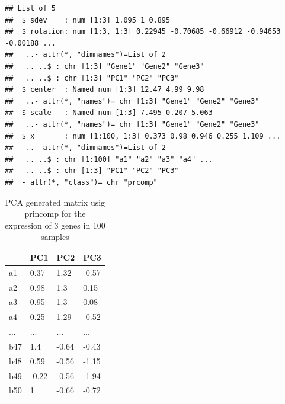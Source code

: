 \documentclass[]{article}
\newenvironment{Shaded}{\begin{snugshade}}{\end{snugshade}}
\newcommand{\KeywordTok}[1]{\textcolor[rgb]{0.13,0.29,0.53}{\textbf{{#1}}}}
\newcommand{\DataTypeTok}[1]{\textcolor[rgb]{0.13,0.29,0.53}{{#1}}}
\newcommand{\StringTok}[1]{\textcolor[rgb]{0.31,0.60,0.02}{{#1}}}
\newcommand{\CommentTok}[1]{\textcolor[rgb]{0.56,0.35,0.01}{\textit{{#1}}}}
\newcommand{\NormalTok}[1]{{#1}}
\numberwithin{figure}{section}
\numberwithin{table}{section}
\theoremstyle{definition}
\theoremstyle{definition}
\theoremstyle{definition}
\theoremstyle{remark}
\begin{document}
\begin{verbatim}
## List of 5
##  $ sdev    : num [1:3] 1.095 1 0.895
##  $ rotation: num [1:3, 1:3] 0.22945 -0.70685 -0.66912 -0.94653 -0.00188 ...
##   ..- attr(*, "dimnames")=List of 2
##   .. ..$ : chr [1:3] "Gene1" "Gene2" "Gene3"
##   .. ..$ : chr [1:3] "PC1" "PC2" "PC3"
##  $ center  : Named num [1:3] 12.47 4.99 9.98
##   ..- attr(*, "names")= chr [1:3] "Gene1" "Gene2" "Gene3"
##  $ scale   : Named num [1:3] 7.495 0.207 5.063
##   ..- attr(*, "names")= chr [1:3] "Gene1" "Gene2" "Gene3"
##  $ x       : num [1:100, 1:3] 0.373 0.98 0.946 0.255 1.109 ...
##   ..- attr(*, "dimnames")=List of 2
##   .. ..$ : chr [1:100] "a1" "a2" "a3" "a4" ...
##   .. ..$ : chr [1:3] "PC1" "PC2" "PC3"
##  - attr(*, "class")= chr "prcomp"
\end{verbatim}

\begin{Shaded}
\end{Shaded}

\begin{table}

\caption{\label{tab:data3prcomp}PCA generated matrix usig princomp for the expression of 3 genes in 100 samples}
\centering
\begin{tabular}[t]{llll}
\toprule
  & PC1 & PC2 & PC3\\
\midrule
a1 & 0.37 & 1.32 & -0.57\\
a2 & 0.98 & 1.3 & 0.15\\
a3 & 0.95 & 1.3 & 0.08\\
a4 & 0.25 & 1.29 & -0.52\\
... & ... & ... & ...\\
\addlinespace
b47 & 1.4 & -0.64 & -0.43\\
b48 & 0.59 & -0.56 & -1.15\\
b49 & -0.22 & -0.56 & -1.94\\
b50 & 1 & -0.66 & -0.72\\
\bottomrule
\end{tabular}
\end{table}
\end{document}
